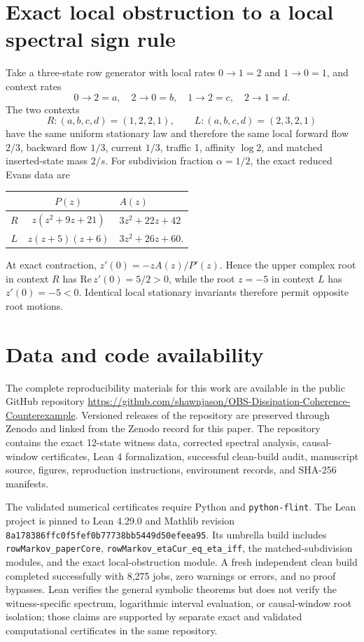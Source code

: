 \documentclass[aps,pre,reprint,groupedaddress,nofootinbib,showkeys,floatfix]{revtex4-2}
\begin{document}
\section{Exact local obstruction to a local spectral sign rule}\label{app:local-obstruction}
Take a three-state row generator with local rates $0\to1=2$ and $1\to0=1$, and context rates
\begin{equation}
0\to2=a,\quad2\to0=b,\quad1\to2=c,\quad2\to1=d.
\end{equation}
The two contexts
\begin{equation}
R:(a,b,c,d)=(1,2,2,1),\qquad
L:(a,b,c,d)=(2,3,2,1)
\end{equation}
have the same uniform stationary law and therefore the same local forward flow $2/3$, backward flow $1/3$, current $1/3$, traffic 1, affinity $\log2$, and matched inserted-state mass $2/s$. For subdivision fraction $\alpha=1/2$, the exact reduced Evans data are
\begin{center}
\begin{tabular}{ccl}
& $P(z)$ & $A(z)$\\
\hline
$R$ & $z(z^2+9z+21)$ & $3z^2+22z+42$\\
$L$ & $z(z+5)(z+6)$ & $3z^2+26z+60$.
\end{tabular}
\end{center}
At exact contraction, $z'(0)=-zA(z)/P'(z)$. Hence the upper complex root in context $R$ has $\mathrm{Re}\,z'(0)=5/2>0$, while the root $z=-5$ in context $L$ has $z'(0)=-5<0$. Identical local stationary invariants therefore permit opposite root motions.

\section{Data and code availability}
The complete reproducibility materials for this work are available in the public GitHub repository \url{https://github.com/shawnjason/OBS-Dissipation-Coherence-Counterexample}. Versioned releases of the repository are preserved through Zenodo and linked from the Zenodo record for this paper. The repository contains the exact 12-state witness data, corrected spectral analysis, causal-window certificates, Lean 4 formalization, successful clean-build audit, manuscript source, figures, reproduction instructions, environment records, and SHA-256 manifests.

The validated numerical certificates require Python and \texttt{python-flint}. The Lean project is pinned to Lean 4.29.0 and Mathlib revision \texttt{8a178386ffc0f5fef0b77738bb5449d50efeea95}. Its umbrella build includes \texttt{rowMarkov\_paperCore}, \texttt{rowMarkov\_etaCur\_eq\_eta\_iff}, the matched-subdivision modules, and the exact local-obstruction module. A fresh independent clean build completed successfully with 8,275 jobs, zero warnings or errors, and no proof bypasses. Lean verifies the general symbolic theorems but does not verify the witness-specific spectrum, logarithmic interval evaluation, or causal-window root isolation; those claims are supported by separate exact and validated computational certificates in the same repository.
\end{document}
